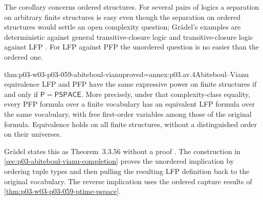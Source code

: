 The corollary concerns ordered structures. For several pairs of logics a
separation on arbitrary finite structures is easy even though the
separation on ordered structures would settle an open complexity question;
Gr\"adel's examples are deterministic against general transitive-closure
logic and transitive-closure logic against LFP
\cite[p.~180]{Gradel2007FMTDescriptiveChapter}. For LFP against PFP the unordered question
is no easier than the ordered one.

\begin{hbtheorem}{thm:p03-w03-p03-059-abiteboul-vianu}{proved=annex:p03.av.4}{Abiteboul--Vianu equivalence}
LFP and PFP have the same expressive power on finite structures if
and only if \(\mathsf P=\mathsf{PSPACE}\). More precisely, under
that complexity-class equality, every PFP formula over a finite
vocabulary has an equivalent LFP formula over the same vocabulary,
with free first-order variables among those of the original formula.
Equivalence holds on all finite structures, without a distinguished
order on their universes.
\end{hbtheorem}

Gr\"adel states this as Theorem~3.3.56 without a proof
\cite[p.~180]{Gradel2007FMTDescriptiveChapter}.
The construction in \cref{sec:p03-abiteboul-vianu-completion}
proves the unordered implication by ordering tuple types and then
pulling the resulting LFP definition back to the original vocabulary.
The reverse implication uses the ordered capture results of
\cref{thm:p03-w03-p03-059-ptime-pspace}.

